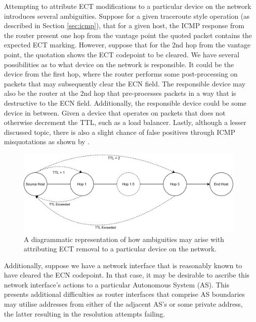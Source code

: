 \documentclass{l4proj}
\begin{document}
Attempting to attribute ECT modifications to a particular device on the network introduces several ambiguities. Suppose for a given traceroute style operation (as described in Section \ref{sec:icmp}), that for a given host, the ICMP response from the router present one hop from the vantage point the quoted packet contains the expected ECT marking. However, suppose that for the 2nd hop from the vantage point, the quotation shows the ECT codepoint to be cleared. We have several possibilities as to what device on the network is responsible. It could be the device from the first hop, where the router performs some post-processing on packets that may subsequently clear the ECN field. The responsible device may also be the router at the 2nd hop that pre-processes packets in a way that is destructive to the ECN field. Additionally, the responsible device could be some device in between. Given a device that operates on packets that does not otherwise decrement the TTL, such as a load balancer. Lastly, although a lesser discussed topic, there is also a slight chance of false positives through ICMP misquotations as shown by \cite{malone_analysis_2007}.

\begin{figure}[H]
\centering
\includegraphics[width=14cm,keepaspectratio]{dissertation/images/ambig_icmp.pdf}
\caption{A diagrammatic representation of how ambiguities may arise with attributing ECT removal to a particular device on the network.}
\label{fig:icmp}
\end{figure}

Additionally, suppose we have a network interface that is reasonably known to have cleared the ECN codepoint. In that case, it may be desirable to ascribe this network interface's actions to a particular Autonomous System (AS). This presents additional difficulties as router interfaces that comprise AS boundaries may utilise addresses from either of the adjacent AS's or some private address, the latter resulting in the resolution attempts failing.
\end{document}
